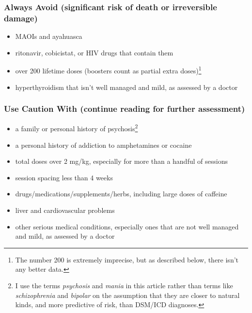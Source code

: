 \documentclass[11pt,oneside]{book}
\begin{document}
\subsubsection*{Always Avoid (significant risk of death or irreversible damage)}
\begin{itemize}
    \item MAOIs and ayahuasca
    \item ritonavir, cobicistat, or HIV drugs that contain them
    \item over 200 lifetime doses (boosters count as partial extra doses)\footnote{The number 200 is extremely imprecise, but as described below, there isn't any better data.}
    \item hyperthyroidism that isn't well managed and mild, as assessed by a doctor
\end{itemize}

\subsubsection*{Use Caution With (continue reading for further assessment)}
\begin{itemize}
    \item a family or personal history of psychosis\footnote{I use the terms \textit{psychosis} and \textit{mania} in this article rather than terms like \textit{schizophrenia} and \textit{bipolar} on the assumption that they are closer to natural kinds, and more predictive of risk, than DSM/ICD diagnoses.}
    \item a personal history of addiction to amphetamines or cocaine
    \item total doses over 2 mg/kg, especially for more than a handful of sessions
    \item session spacing less than 4 weeks
    \item drugs/medications/supplements/herbs, including large doses of caffeine
    \item liver and cardiovascular problems
    \item other serious medical conditions, especially ones that are not well managed and mild, as assessed by a doctor
\end{itemize}
\end{document}
